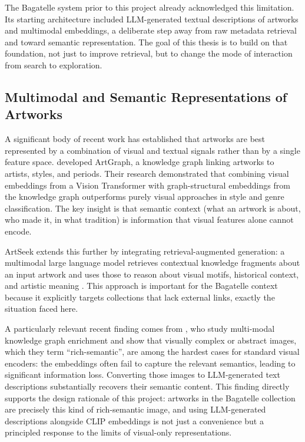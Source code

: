 \documentclass[12pt, a4paper]{article}
\begin{document}
The Bagatelle system prior to this project already acknowledged this limitation. Its starting
architecture included LLM-generated textual descriptions of artworks and multimodal embeddings,
a deliberate step away from raw metadata retrieval and toward semantic representation. The goal
of this thesis is to build on that foundation, not just to improve retrieval, but to change the mode
of interaction from search to exploration.

\subsection{Multimodal and Semantic Representations of Artworks}

A significant body of recent work has established that artworks are best represented by a
combination of visual and textual signals rather than by a single feature space. \citet{castellano2022}
developed ArtGraph, a knowledge graph linking artworks to artists, styles, and periods. Their
research demonstrated that combining visual embeddings from a Vision Transformer with
graph-structural embeddings from the knowledge graph outperforms purely visual approaches in
style and genre classification. The key insight is that semantic context (what an artwork is about,
who made it, in what tradition) is information that visual features alone cannot encode.

ArtSeek extends this further by integrating retrieval-augmented generation: a multimodal large
language model retrieves contextual knowledge fragments about an input artwork and uses those
to reason about visual motifs, historical context, and artistic meaning \citep{fanelli2025}. This
approach is important for the Bagatelle context because it explicitly targets collections that lack
external links, exactly the situation faced here.

A particularly relevant recent finding comes from \citet{zhang2026}, who study multi-modal
knowledge graph enrichment and show that visually complex or abstract images, which they term
``rich-semantic'', are among the hardest cases for standard visual encoders: the embeddings often
fail to capture the relevant semantics, leading to significant information loss. Converting those
images to LLM-generated text descriptions substantially recovers their semantic content. This
finding directly supports the design rationale of this project: artworks in the Bagatelle collection
are precisely this kind of rich-semantic image, and using LLM-generated descriptions alongside
CLIP embeddings is not just a convenience but a principled response to the limits of visual-only
representations.
\end{document}
